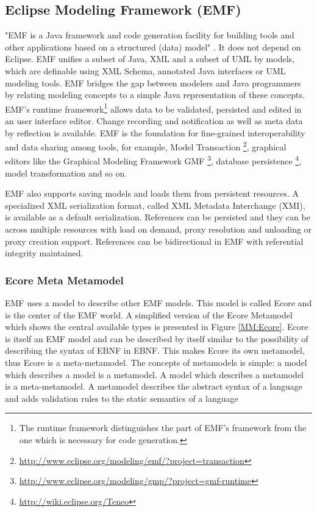 \subsection{Eclipse Modeling Framework (EMF) }
"EMF is a Java framework and code generation facility for building tools and other applications based on a structured (data) model" \cite{EMFDoc}. 
It does not depend on Eclipse. EMF unifies a subset of Java, XML and a subset of UML by models, which are definable using XML Schema, annotated Java interfaces or UML modeling tools. EMF bridges the gap between modelers and Java programmers by relating modeling concepts to a simple Java representation of these concepts. \cite{EMF2nd}\\

EMF's runtime framework\footnote{\raggedright The runtime framework distinguishes the part of EMF's framework from the one which is necessary for code generation.} allows data to be validated, persisted and edited in an user interface editor. Change recording and notification as well as meta data by reflection is available. EMF is the foundation for fine-grained interoperability and data sharing among tools, for example, Model Transaction \footnote{\raggedright \url{http://www.eclipse.org/modeling/emf/?project=transaction}}, graphical editors like the Graphical Modeling Framework GMF \footnote{\raggedright \url{http://www.eclipse.org/modeling/gmp/?project=gmf-runtime}}, database persistence \footnote{\raggedright \url{http://wiki.eclipse.org/Teneo}}, model transformation and so on.

EMF also supports saving models and loads them from persistent resources. A specialized XML serialization format, called XML Metadata Interchange (XMI), is available as a default serialization. References can be persisted and they can be across multiple resources with load on demand, proxy resolution and unloading or proxy creation support. References can be bidirectional in EMF with referential integrity maintained. \cite{EMF2nd}\\

\subsubsection{Ecore Meta Metamodel} \label{ecore}
EMF uses a model to describe other EMF models. This model is called Ecore and is the center of the EMF world. A simplified version of the Ecore Metamodel which shows the central available types is presented in Figure \ref{MM:Ecore}. Ecore is itself an EMF model and can be described by itself similar to the possibility of describing the syntax of EBNF in EBNF. This makes Ecore its own metamodel, thus Ecore is a meta-metamodel. The concepts of metamodels is simple: a model which describes a model is a metamodel. A model which describes a metamodel is a meta-metamodel. \cite{EMF2nd}  A metamodel describes the abstract syntax of a language \cite{EMP} and adds validation rules to the static semantics of a language \cite{MDSD}

